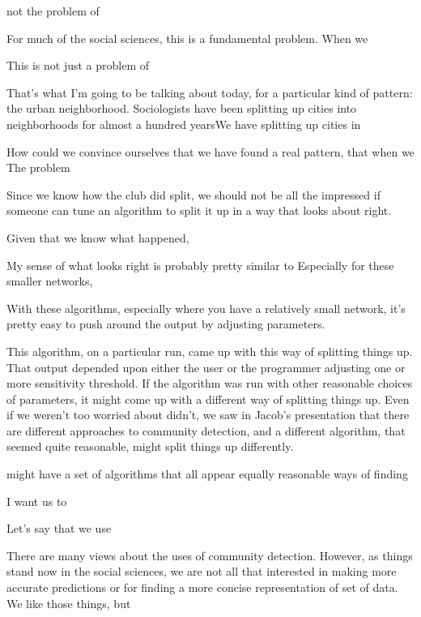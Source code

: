 not the problem of 

For much of the social sciences, this is a fundamental problem. When we 


This is not just a problem of 

That's what I'm going to be talking about today, for a particular kind
of pattern: the urban neighborhood. Sociologists have been splitting up cities into neighborhoods for almost a hundred yearsWe have splitting up cities in




How could we convince ourselves that we have found a real pattern, that when we The problem 




 Since we know how the club did split, we
should not be all the impressed if someone can tune an algorithm to
split it up in a way that looks about right.





Given that we know what happened, 


My sense of what looks right is probably pretty similar to Especially for these smaller networks, 

With these algorithms, especially where you have a
relatively small network, it's pretty easy to push around the
output by adjusting parameters. 

This algorithm, on a particular run, came up with
this way of splitting things up. That output depended upon either the
user or the programmer adjusting one or more sensitivity threshold. If
the algorithm was run with other reasonable choices of parameters, it
might come up with a different way of splitting things up. Even if we weren't too worried about 
didn't, we saw in Jacob's presentation that there are different
approaches to community detection, and a different algorithm, that
seemed quite reasonable, might split things up differently.



 might have a set of algorithms that all appear equally reasonable ways of finding 






I want us to 



Let's say that we use 




There are many views about the uses of community detection. However,
as things stand now in the social sciences, we are not all that
interested in making more accurate predictions or for finding a more
concise representation of set of data. We like those things, but 

